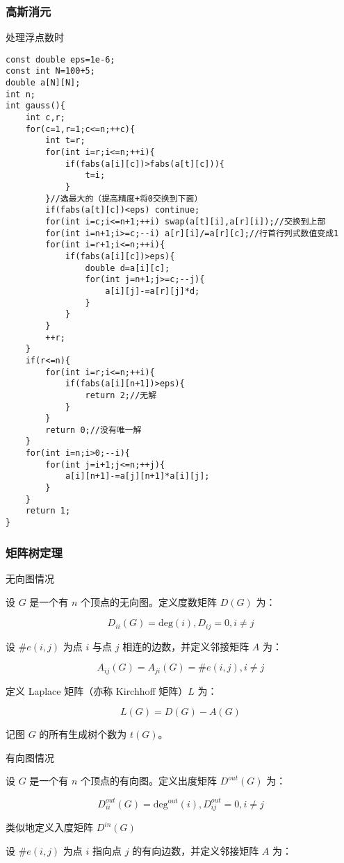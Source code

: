 \documentclass[UTF8]{ctexart}
\begin{document}
\subsubsection{高斯消元}
处理浮点数时
\begin{lstlisting}
const double eps=1e-6;
const int N=100+5;
double a[N][N];
int n;
int gauss(){
    int c,r;
    for(c=1,r=1;c<=n;++c){
        int t=r;
        for(int i=r;i<=n;++i){
            if(fabs(a[i][c])>fabs(a[t][c])){
                t=i;
            }
        }//选最大的（提高精度+将0交换到下面）
        if(fabs(a[t][c])<eps) continue;
        for(int i=c;i<=n+1;++i) swap(a[t][i],a[r][i]);//交换到上部
        for(int i=n+1;i>=c;--i) a[r][i]/=a[r][c];//行首行列式数值变成1
        for(int i=r+1;i<=n;++i){
            if(fabs(a[i][c])>eps){
                double d=a[i][c];
                for(int j=n+1;j>=c;--j){
                    a[i][j]-=a[r][j]*d;
                }
            }
        }
        ++r;
    }
    if(r<=n){
        for(int i=r;i<=n;++i){
            if(fabs(a[i][n+1])>eps){
                return 2;//无解
            }
        }
        return 0;//没有唯一解
    }
    for(int i=n;i>0;--i){
        for(int j=i+1;j<=n;++j){
            a[i][n+1]-=a[j][n+1]*a[i][j];
        }
    }
    return 1;
}
\end{lstlisting}
\subsubsection{矩阵树定理}

无向图情况

设 $G$ 是一个有 $n$ 个顶点的无向图。定义度数矩阵 $D(G)$ 为：

$$
D_{ii}(G) = \mathrm{deg}(i), D_{ij} = 0, i\neq j
$$

设 $\#e(i,j)$ 为点 $i$ 与点 $j$ 相连的边数，并定义邻接矩阵 $A$ 为：

$$
A_{ij}(G)=A_{ji}(G)=\#e(i,j), i\neq j
$$

定义 Laplace 矩阵（亦称 Kirchhoff 矩阵）$L$ 为：

$$
L(G) = D(G) - A(G)
$$

记图 $G$ 的所有生成树个数为 $t(G)$。

有向图情况

设 $G$ 是一个有 $n$ 个顶点的有向图。定义出度矩阵 $D^{out}(G)$ 为：

$$
D^{out}_{ii}(G) = \mathrm{deg^{out}}(i), D^{out}_{ij} = 0, i\neq j
$$

类似地定义入度矩阵 $D^{in}(G)$

设 $\#e(i,j)$ 为点 $i$ 指向点 $j$ 的有向边数，并定义邻接矩阵 $A$ 为：
\end{document}
